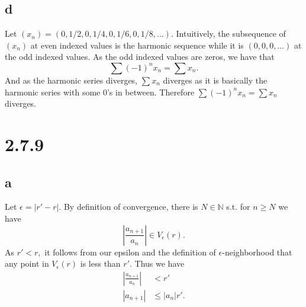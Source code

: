 \documentclass[10pt]{article}
\begin{document}
\subsection*{d}
Let $(x_n) = (0,1/2,0,1/4,0,1/6,0,1/8,...).$ Intuitively, the subsequence of $(x_n)$ at even indexed values is the harmonic sequence while it is $(0,0,0,...)$ at the odd indexed values. As the odd indexed values are zeros, we have that
\[\sum (-1)^nx_n = \sum x_n.\]
And as the harmonic series diverges, $\sum x_n$ diverges as it is basically the harmonic series with some $0$'s in between.
Therefore $\sum (-1)^nx_n = \sum x_n$ diverges.

\section*{2.7.9}

\subsection*{a}

Let $\epsilon = |r'-r|.$ By definition of convergence, there is $N\in\mathbb{N}$ s.t. for $n\ge N$ we have 
\[\left | \frac{a_{n+1}}{a_n}\right | \in V_\epsilon(r).\]
As $r' < r,$ it follows from our epsilon and the definition of $\epsilon$-neighborhood that any point in $V_\epsilon(r)$ is less than $r'.$ Thus we have
\begin{align*}
    \left | \frac{a_{n+1}}{a_n}\right | &< r'\\
    |a_{n+1}|&\le |a_n|r'.
\end{align*}
\end{document}
